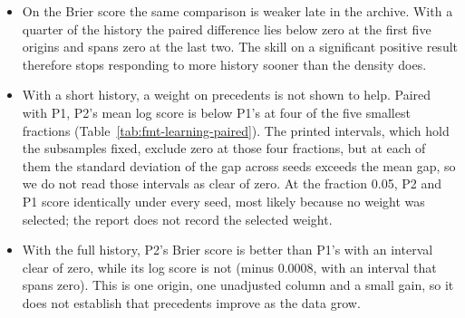 \begin{itemize}
\item On the Brier score the same comparison is weaker late in the archive. With a quarter of the history the paired difference lies below zero at the first five origins and spans zero at the last two. The skill on a significant positive result therefore stops responding to more history sooner than the density does.
\item With a short history, a weight on precedents is not shown to help. Paired with P1, P2's mean log score is below P1's at four of the five smallest fractions (Table~\ref{tab:fmt-learning-paired}). The printed intervals, which hold the subsamples fixed, exclude zero at those four fractions, but at each of them the standard deviation of the gap across seeds exceeds the mean gap, so we do not read those intervals as clear of zero. At the fraction 0.05, P2 and P1 score identically under every seed, most likely because no weight was selected; the report does not record the selected weight.
\item With the full history, P2's Brier score is better than P1's with an interval clear of zero, while its log score is not (minus 0.0008, with an interval that spans zero). This is one origin, one unadjusted column and a small gain, so it does not establish that precedents improve as the data grow.

\end{itemize}
